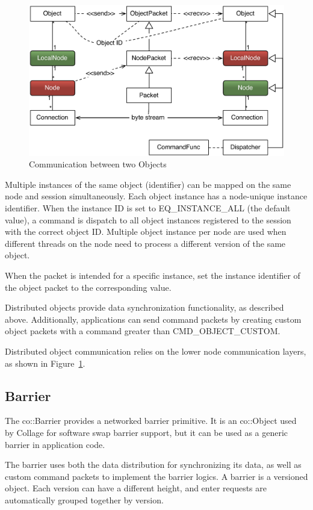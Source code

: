 \documentclass[10pt,a4]{scrartcl}
\newcommand{\fig}[1]{Figure~\ref{#1}}
\begin{document}
\begin{figure}
  \includegraphics[width=.618\textwidth]{images/netObject.pdf}
  {\caption{\label{fNetObject}Communication between two Objects}}
\end{figure}
Multiple instances of the same object (identifier) can be mapped on the same
node and session simultaneously. Each object instance has a node-unique instance
identifier. When the instance ID is set to \textsf{EQ\_INSTANCE\_ALL} (the
default value), a command is dispatch to all object instances registered to the
session with the correct object ID. Multiple object instance per node are used
when different threads on the node need to process a different version of the
same object.

When the packet is intended for a specific instance, set the instance identifier
of the object packet to the corresponding value.

Distributed objects provide data synchronization functionality, as described
above. Additionally, applications can send command packets by creating custom
object packets with a command greater than \textsf{CMD\_OBJECT\_CUSTOM}.

Distributed object communication relies on the lower node communication layers,
as shown in \fig{fNetObject}.

\subsection{Barrier}

The \textsf{co::Barrier} provides a networked barrier primitive. It is an
\textsf{co::Object} used by Collage for software swap barrier support, but it
can be used as a generic barrier in application code.

The barrier uses both the data distribution for synchronizing its data,
as well as custom command packets to implement the barrier logics. A
barrier is a versioned object. Each version can have a different height,
and enter requests are automatically grouped together by version.
\end{document}
